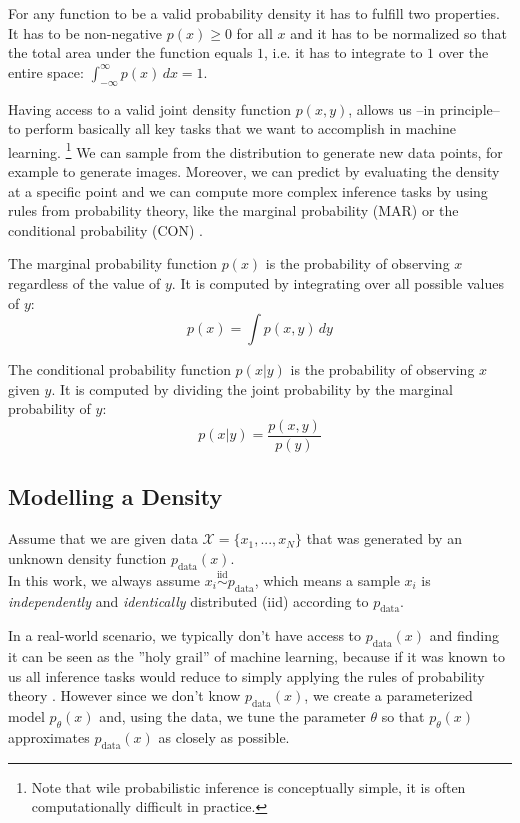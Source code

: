 For any function to be a valid probability density it has to fulfill two properties. 
It has to be non-negative $p(x) \geq 0$ for all $x$
and it has to be normalized so that the total area under the function equals $1$, i.e. it has to integrate to $1$ over the entire space: $\int_{-\infty}^{\infty} p(x) \, dx = 1$.

Having access to a valid joint density function $p(x, y)$, allows us --in principle-- to perform basically all key tasks that we want to accomplish in machine learning. \footnote{Note that wile probabilistic inference is conceptually simple, it is often computationally difficult in practice.}
We can sample from the distribution to generate new data points, for example to generate images. Moreover, we can predict by evaluating the density at a specific point and 
we can compute more complex inference tasks by using rules from probability theory, like the marginal probability (MAR) or 
the conditional probability (CON) \cite{pc_intro}.

The marginal probability function $p(x)$ is the probability of observing $x$ regardless of the value of $y$. 
It is computed by integrating over all possible values of $y$:
\[
    p(x) = \int p(x, y) \, dy
\]

The conditional probability function $p(x|y)$ is the probability of observing $x$ given $y$.
It is computed by dividing the joint probability by the marginal probability of $y$:
\[
    p(x|y) = \frac{p(x, y)}{p(y)}
\]

\subsection{Modelling a Density}
\label{sec:modelling_a_density}

Assume that we are given data $ \mathcal{X} = \{x_1, ..., x_N\}$ that was generated by an unknown density function $p_{\text{data}}(x)$. \\
In this work, we always assume $x_i \overset{\text{iid}}{\sim} p_{\text{data}}$, which means 
a sample $x_i$ is \emph{independently} and \emph{identically} distributed (iid) according to $p_{\text{data}}$.

In a real-world scenario, we typically don't have access to $p_{\text{data}}(x)$ and finding it can be seen as the ''holy grail'' of machine learning, because if it was known to us all inference tasks would reduce to simply applying the 
rules of probability theory \cite{pc_intro}. However since we don't know $p_{\text{data}}(x)$,
we create a parameterized model $p_\theta(x)$ and, using the data, we tune the parameter $\theta$ so that $p_\theta(x)$ approximates $p_{\text{data}}(x)$ as closely as possible. \\

